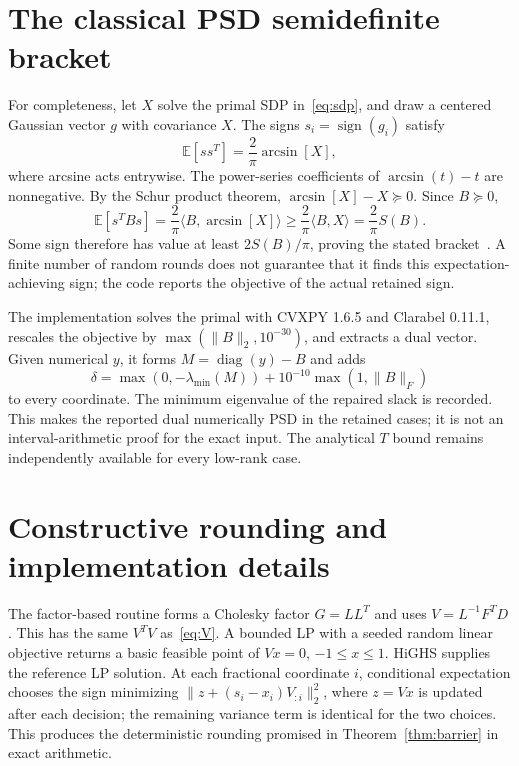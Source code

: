 \documentclass[final,leqno,letterpaper]{etna}
\renewcommand{\diag}{\operatorname{diag}}
\newcommand{\sgn}{\operatorname{sign}}
\begin{document}
\appendix
\section{The classical PSD semidefinite bracket}\label{app:sdp}
For completeness, let $X$ solve the primal SDP in~\eqref{eq:sdp}, and draw a centered Gaussian vector $g$ with covariance $X$. The signs $s_i=\sgn(g_i)$ satisfy
\begin{equation*}
 \mathbb E[ss^T]=\frac2\pi\arcsin[X],
\end{equation*}
where arcsine acts entrywise. The power-series coefficients of $\arcsin(t)-t$ are nonnegative. By the Schur product theorem, $\arcsin[X]-X\succeq0$. Since $B\succeq0$,
\begin{equation*}
 \mathbb E[s^TBs]=\frac2\pi\langle B,\arcsin[X]\rangle
 \ge\frac2\pi\langle B,X\rangle=\frac2\pi S(B).
\end{equation*}
Some sign therefore has value at least $2S(B)/\pi$, proving the stated bracket~\cite{nesterov}. A finite number of random rounds does not guarantee that it finds this expectation-achieving sign; the code reports the objective of the actual retained sign.

The implementation solves the primal with CVXPY 1.6.5 and Clarabel 0.11.1, rescales the objective by $\max(\|B\|_2,10^{-30})$, and extracts a dual vector. Given numerical $y$, it forms $M=\diag(y)-B$ and adds
\begin{equation*}
 \delta=\max(0,-\lambda_{\min}(M))+10^{-10}\max(1,\|B\|_F)
\end{equation*}
to every coordinate. The minimum eigenvalue of the repaired slack is recorded. This makes the reported dual numerically PSD in the retained cases; it is not an interval-arithmetic proof for the exact input. The analytical $T$ bound remains independently available for every low-rank case.

\section{Constructive rounding and implementation details}
The factor-based routine forms a Cholesky factor $G=LL^T$ and uses $V=L^{-1}F^TD$. This has the same $V^TV$ as~\eqref{eq:V}. A bounded LP with a seeded random linear objective returns a basic feasible point of $Vx=0$, $-1\le x\le1$. HiGHS supplies the reference LP solution. At each fractional coordinate $i$, conditional expectation chooses the sign minimizing
$\|z+(s_i-x_i)V_{:i}\|_2^2$, where $z=Vx$ is updated after each decision; the remaining variance term is identical for the two choices. This produces the deterministic rounding promised in Theorem~\ref{thm:barrier} in exact arithmetic.
\end{document}
